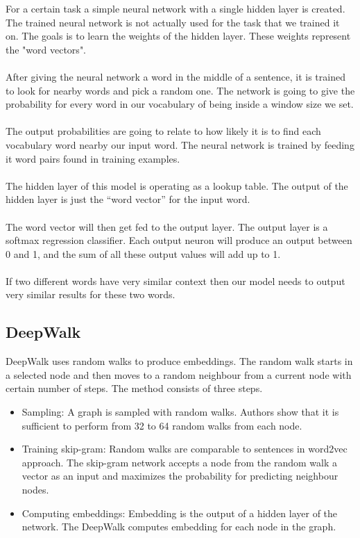 For a certain task a simple neural network with a single hidden layer is created. The trained neural network is not actually used for the task that we trained it on. The goals is to learn the weights of the hidden layer. These weights represent the "word vectors".
\\
\\
After giving the neural network a word in the middle of a sentence, it is trained to look for nearby words and pick a random one. The network is going to give the probability for every word in our vocabulary of being inside a window size we set.
\\
\\
The output probabilities are going to relate to how likely it is to find each vocabulary word nearby our input word. The neural network is trained by feeding it word pairs found in training examples.
\\
\\
The hidden layer of this model is operating as a lookup table. The output of the hidden layer is just the “word vector” for the input word.
\\
\\
The word vector will then get fed to the output layer. The output layer is a softmax regression classifier. Each output neuron will produce an output between 0 and 1, and the sum of all these output values will add up to 1.
\\
\\
If two different words have very similar context then our model needs to output very similar results for these two words.


\subsection{DeepWalk}

DeepWalk uses random walks to produce embeddings. The random walk starts in a selected node and then moves to a random neighbour from a current node with certain number of steps. The method consists of three steps.

 \begin{itemize}
  \item Sampling: A graph is sampled with random walks. Authors show that it is sufficient to perform from 32 to 64 random walks from each node. 
  
    
  \item Training skip-gram: Random walks are comparable to sentences in word2vec approach. The skip-gram network accepts a node from the random walk a vector as an input and maximizes the probability for predicting neighbour nodes. 
  
  \item Computing embeddings: Embedding is the output of a hidden layer of the network. The DeepWalk computes embedding for each node in the graph.
   
  \end{itemize}

